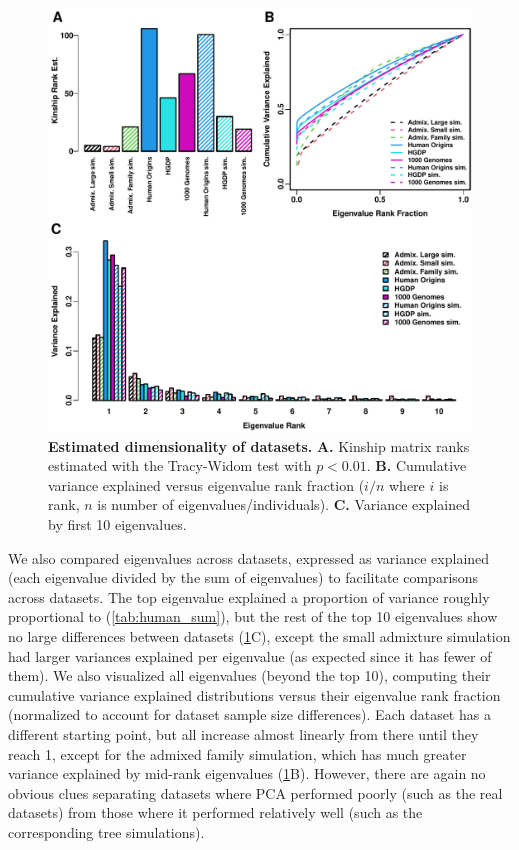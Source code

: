 \documentclass[11pt]{article}
\begin{document}
\begin{figure}[bp!]
  \centering
  \includegraphics[width=\textwidth]{eigen.pdf}
  \caption{
    {\bf Estimated dimensionality of datasets.}
    \textbf{A.}
    Kinship matrix ranks estimated with the Tracy-Widom test with $p < 0.01$.
    \textbf{B.}
    Cumulative variance explained versus eigenvalue rank fraction ($i/n$ where $i$ is rank, $n$ is number of eigenvalues/individuals).
    \textbf{C.}
    Variance explained by first 10 eigenvalues.
  }
  \label{fig:eigen}
\end{figure}

We also compared eigenvalues across datasets, expressed as variance explained (each eigenvalue divided by the sum of eigenvalues) to facilitate comparisons across datasets.
The top eigenvalue explained a proportion of variance roughly proportional to \Fst (\cref{tab:human_sum}), but the rest of the top 10 eigenvalues show no large differences between datasets (\cref{fig:eigen}C), except the small admixture simulation had larger variances explained per eigenvalue (as expected since it has fewer of them).
We also visualized all eigenvalues (beyond the top 10), computing their cumulative variance explained distributions versus their eigenvalue rank fraction (normalized to account for dataset sample size differences).
Each dataset has a different starting point, but all increase almost linearly from there until they reach 1, except for the admixed family simulation, which has much greater variance explained by mid-rank eigenvalues (\cref{fig:eigen}B).
However, there are again no obvious clues separating datasets where PCA performed poorly (such as the real datasets) from those where it performed relatively well (such as the corresponding tree simulations).
\end{document}

